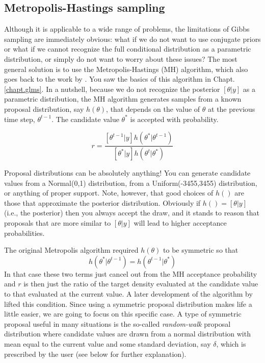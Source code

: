 \subsection{ Metropolis-Hastings sampling   }
\label{mcmc.sec.mh}

Although it is applicable to a wide range of problems, the limitations
of Gibbs sampling are immediately obvious: what if we do not want to
use conjugate priors or what if we cannot recognize the full
conditional distribution as a parametric distribution, or simply do
not want to worry about these issues? The most general solution is to
use the Metropolis-Hastings (MH) algorithm, which also goes back to
the work by \citet{metropolis_ulam:1953}. You saw the basics of this
algorithm in Chapt. \ref{chapt.glms}. In a nutshell, because we do not recognize the
posterior $[\theta|y]$ as a parametric distribution, the MH algorithm
generates samples from a known proposal distribution, say $h(\theta)$,
that depends on the value of $\theta$ at the previous time step,  $\theta^{t-1}$. The candidate value $\theta^*$ is accepted with probability. 

\[
r = \frac{ [\theta^{t-1}|y] h(\theta^{*}|\theta^{t-1})}
    {[\theta^{*}|y] h(\theta^{t}|\theta^{*}) }
\]

Proposal distributions can be absolutely
anything!  You can generate candidate values from a Normal(0,1)
distribution, from a Uniform(-3455,3455) distribution, or anything of
proper support.  Note, however, that good choices of $h()$ are those
that approximate the posterior distribution. Obviously if $h() =
[\theta|y]$ (i.e., the posterior) then you always accept the draw,
and it stands to reason that proposals that are more similar to
$[\theta|y]$ will lead to higher acceptance probabilities. 

The original Metropolis algorithm
required $h(\theta)$ to be symmetric so that
\[
h(\theta^{*}|\theta^{t-1}) = h(\theta^{t-1}|\theta^{*})
\]
In that case these two terms just cancel
out from the MH acceptance probability and $r$ is then just the ratio
of the target density evaluated at the candidate value to that
evaluated at the current value. A later
development of the algorithm by \citet{hastings:1970} lifted this
condition. 
Since using a symmetric proposal distribution makes life a little
easier, we are going to focus on this specific case. A type of symmetric proposal useful in many situations is the
so-called {\it random-walk} proposal distribution where candidate values
are drawn from a normal distribution with mean equal to the current
value and some standard deviation, say $\delta$, which is prescribed by
the user (see below for further explanation). 

